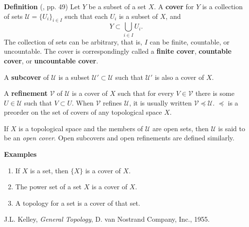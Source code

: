 \documentclass[12pt]{article}
\begin{document}
{\bf Definition} (\cite{kelley}, pp. 49)
Let $Y$ be a subset of a set $X$. A \textbf{cover} for $Y$ is a collection
of sets $\mathcal{U}=\{U_i\}_{i\in I}$ such that each $U_i$ 
is a subset of $X$, and 
$$ Y \subset \bigcup_{i\in I} U_i.$$
The collection of sets can be arbitrary, that is, $I$ can be 
finite, countable, or uncountable. The cover is  correspondingly called a 
\textbf{finite cover}, \textbf{countable cover}, or \textbf{uncountable cover}.


A \textbf{subcover} of $\mathcal{U}$ is a subset $\mathcal{U}'\subset\mathcal{U}$ such that $\mathcal{U}'$ is also a cover of $X$.

A \textbf{refinement} $\mathcal{V}$ of $\mathcal{U}$ is a cover of $X$ such that for every $V\in\mathcal{V}$ there is some $U\in\mathcal{U}$ such that $V\subset U$.  When $\mathcal{V}$ refines $\mathcal{U}$, it is usually written $\mathcal{V}\preceq \mathcal{U}$.  $\preceq$ is a preorder on the set of covers of any topological space $X$.

If $X$ is a topological space and the members of $\mathcal{U}$ are open sets,
then $\mathcal{U}$ is said to be an \emph{open cover}.
Open subcovers and open refinements are defined similarly.

{\bf Examples}
\begin{enumerate}
\item If $X$ is a set, then $\{X\}$ is a cover of $X$. 
\item The power set of a set $X$ is a cover of $X$.
\item A topology for a set is a cover of that set.
\end{enumerate}


\begin{thebibliography}{9}
  J.L. Kelley, \emph{General Topology},
 D. van Nostrand Company, Inc., 1955.
 \end{thebibliography}
\end{document}
